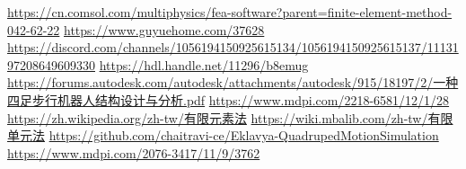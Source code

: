 \newpage
\renewcommand\bibname{參~考~文~獻}
\begin{thebibliography}{99}  %
\href{https://cn.comsol.com/multiphysics/fea-software?parent=finite-element-method-042-62-22}{https://cn.comsol.com/multiphysics/fea-software?parent=finite-element-method-042-62-22}
\href{https://www.guyuehome.com/37628}{https://www.guyuehome.com/37628}
\href{https://discord.com/channels/1056194150925615134/1056194150925615137/1113197208649609330}{https://discord.com/channels/1056194150925615134/1056194150925615137/1113197208649609330}
\href{https://hdl.handle.net/11296/b8emug}{https://hdl.handle.net/11296/b8emug}
\href{https://forums.autodesk.com/autodesk/attachments/autodesk/915/18197/2/一种四足步行机器人结构设计与分析.pdf}{https://forums.autodesk.com/autodesk/attachments/autodesk/915/18197/2/一种四足步行机器人结构设计与分析.pdf}
\href{https://www.mdpi.com/2218-6581/12/1/28}{https://www.mdpi.com/2218-6581/12/1/28}
\href{https://zh.wikipedia.org/zh-tw/有限元素法}{https://zh.wikipedia.org/zh-tw/有限元素法}
\href{https://wiki.mbalib.com/zh-tw/有限单元法}{https://wiki.mbalib.com/zh-tw/有限单元法}
\href{https://github.com/chaitravi-ce/Eklavya-QuadrupedMotionSimulation}{https://github.com/chaitravi-ce/Eklavya-QuadrupedMotionSimulation}
\href{https://www.mdpi.com/2076-3417/11/9/3762}{https://www.mdpi.com/2076-3417/11/9/3762}\label{Robot}

%
\end{thebibliography}
\newpage
